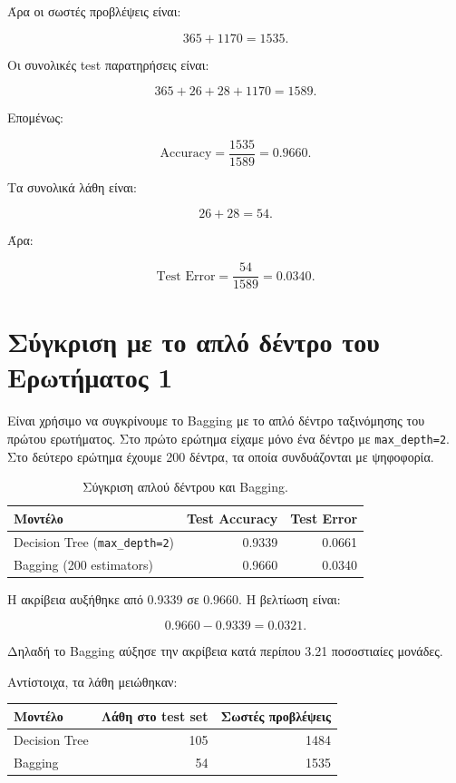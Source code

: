 \documentclass[12pt,a4paper]{article}
\newcommand{\code}[1]{\texttt{\textenglish{#1}}}
\begin{document}
Άρα οι σωστές προβλέψεις είναι:

\[
    365 + 1170 = 1535.
\]

Οι συνολικές test παρατηρήσεις είναι:

\[
    365 + 26 + 28 + 1170 = 1589.
\]

Επομένως:

\[
    \text{Accuracy} = \frac{1535}{1589} = 0.9660.
\]

Τα συνολικά λάθη είναι:

\[
    26 + 28 = 54.
\]

Άρα:

\[
    \text{Test Error} = \frac{54}{1589} = 0.0340.
\]

\section{Σύγκριση με το απλό δέντρο του Ερωτήματος 1}

Είναι χρήσιμο να συγκρίνουμε το Bagging με το απλό δέντρο ταξινόμησης του
πρώτου ερωτήματος. Στο πρώτο ερώτημα είχαμε μόνο ένα δέντρο με
\code{max\_depth=2}. Στο δεύτερο ερώτημα έχουμε 200 δέντρα, τα οποία
συνδυάζονται με ψηφοφορία.

\begin{table}[H]
\centering
\caption{Σύγκριση απλού δέντρου και Bagging.}
\begin{tabular}{lrr}
\toprule
\textbf{Μοντέλο} & \textbf{Test Accuracy} & \textbf{Test Error} \\
\midrule
Decision Tree (\code{max\_depth=2}) & 0.9339 & 0.0661 \\
Bagging (200 estimators) & 0.9660 & 0.0340 \\
\bottomrule
\end{tabular}
\end{table}

Η ακρίβεια αυξήθηκε από 0.9339 σε 0.9660. Η βελτίωση είναι:

\[
    0.9660 - 0.9339 = 0.0321.
\]

Δηλαδή το Bagging αύξησε την ακρίβεια κατά περίπου 3.21 ποσοστιαίες μονάδες.

Αντίστοιχα, τα λάθη μειώθηκαν:

\begin{center}
\begin{tabular}{lrr}
\toprule
\textbf{Μοντέλο} & \textbf{Λάθη στο test set} & \textbf{Σωστές προβλέψεις} \\
\midrule
Decision Tree & 105 & 1484 \\
Bagging & 54 & 1535 \\
\bottomrule
\end{tabular}
\end{center}
\end{document}
